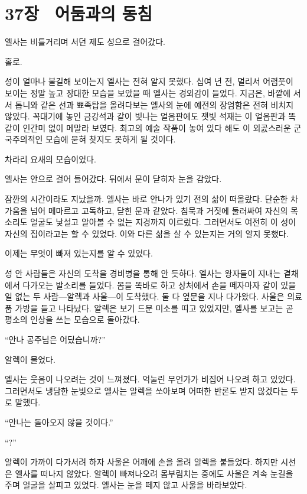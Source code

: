 ﻿

\chapter[37장  어둠과의 동침][37장\hspace*{.5em}어둠과의 동침]{37장 \ 어둠과의 동침}



엘사는 비틀거리며 서던 제도 성으로 걸어갔다.

홀로.

성이 얼마나 불길해 보이는지 엘사는 전혀 알지 못했다. 십여 년 전, 멀리서 어렴풋이 보이는 정말 높고 장대한 모습을 보았을 때 엘사는 경외감이 들었다. 지금은, 바깥에 서서 톱니와 같은 선과 뾰족탑을 올려다보는 엘사의 눈에 예전의 장엄함은 전혀 비치지 않았다. 꼭대기에 놓인 금강석과 같이 빛나는 얼음판에도 잿빛 석재는 이 얼음판과 똑같이 인간미 없이 메말라 보였다. 최고의 예술 작품이 놓여 있다 해도 이 외곬스러운 군국주의적인 모습에 묻혀 찾지도 못하게 될 것이다.

차라리 요새의 모습이었다.

엘사는 안으로 걸어 들어갔다. 뒤에서 문이 닫히자 눈을 감았다.

잠깐의 시간이라도 지났을까. 엘사는 바로 안나가 있기 전의 삶이 떠올랐다. 단순한 차가움을 넘어 메마르고 고독하고, 닫힌 문과 같았다. 침묵과 거짓에 둘러싸여 자신의 목소리도 얼굴도 낯설고 알아볼 수 없는 지경까지 이르렀다. 그러면서도 여전히 이 성이 자신의 집이라고는 할 수 있었다. 이와 다른 삶을 살 수 있는지는 거의 알지 못했다.

이제는 무엇이 빠져 있는지를 알 수 있었다.

성 안 사람들은 자신의 도착을 경비병을 통해 안 듯하다. 엘사는 왕자들이 지내는 곁채에서 다가오는 발소리를 들었다. 몸을 똑바로 하고 상처에서 손을 떼자마자 같이 있을 일 없는 두 사람—알렉과 사울—이 도착했다. 둘 다 옆문을 지나 다가왔다. 사울은 의료품 가방을 들고 나타났다. 알렉은 보기 드문 미소를 띠고 있었지만, 엘사를 보고는 곧 평소의 인상을 쓰는 모습으로 돌아갔다.

``안나 공주님은 어딨습니까?''

알렉이 물었다.

엘사는 웃음이 나오려는 것이 느껴졌다. 억눌린 무언가가 비집어 나오려 하고 있었다. 그러면서도 냉담한 눈빛으로 엘사는 알렉을 쏘아보며 어떠한 반론도 받지 않겠다는 투로 말했다.

``안나는 돌아오지 않을 것이다.''

``?''

알렉이 가까이 다가서려 하자 사울은 어깨에 손을 올려 알렉을 붙들었다. 하지만 시선은 엘사를 떠나지 않았다. 알렉이 빠져나오려 몸부림치는 중에도 사울은 계속 눈길을 주며 얼굴을 살피고 있었다. 엘사는 눈을 떼지 않고 사울을 바라보았다.

